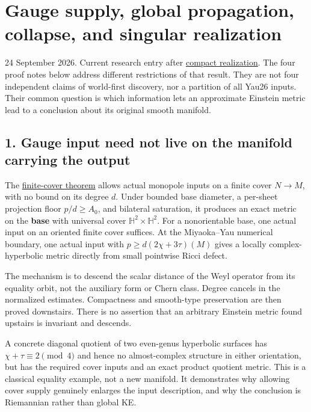 \documentclass[
  11pt,
]{article}
\author{}
\date{}
\begin{document}
\hypertarget{gauge-supply-global-propagation-collapse-and-singular-realization}{%
\section{Gauge supply, global propagation, collapse, and singular
realization}\label{gauge-supply-global-propagation-collapse-and-singular-realization}}

24 September 2026. Current research entry after
\href{20260924_global_realization.md}{compact realization}. The four
proof notes below address different restrictions of that result. They
are not four independent claims of world-first discovery, nor a
partition of all Yau26 inputs. Their common question is which
information lets an approximate Einstein metric lead to a conclusion
about its original smooth manifold.

\hypertarget{gauge-input-need-not-live-on-the-manifold-carrying-the-output}{%
\subsection{1. Gauge input need not live on the manifold carrying the
output}\label{gauge-input-need-not-live-on-the-manifold-carrying-the-output}}

The \href{20260924_virtual_gauge_realization.md}{finite-cover theorem}
allows actual monopole inputs on a finite cover \(N\to M\), with no
bound on its degree \(d\). Under bounded base diameter, a per-sheet
projection floor \(p/d\ge A_0\), and bilateral saturation, it produces
an exact metric on the \textbf{base} with universal cover
\(\mathbb H^2\times\mathbb H^2\). For a nonorientable base, one actual
input on an oriented finite cover suffices. At the Miyaoka--Yau
numerical boundary, one actual input with \(p\ge d(2\chi+3\tau)(M)\)
gives a locally complex-hyperbolic metric directly from small pointwise
Ricci defect.

The mechanism is to descend the scalar distance of the Weyl operator
from its equality orbit, not the auxiliary form or Chern class. Degree
cancels in the normalized estimates. Compactness and smooth-type
preservation are then proved downstairs. There is no assertion that an
arbitrary Einstein metric found upstairs is invariant and descends.

A concrete diagonal quotient of two even-genus hyperbolic surfaces has
\(\chi+\tau\equiv2\pmod4\) and hence no almost-complex structure in
either orientation, but has the required cover inputs and an exact
product quotient metric. This is a classical equality example, not a new
manifold. It demonstrates why allowing cover supply genuinely enlarges
the input description, and why the conclusion is Riemannian rather than
global KE.
\end{document}
